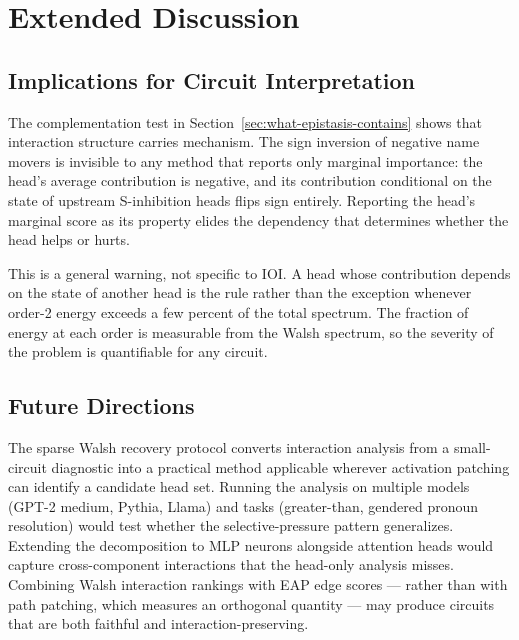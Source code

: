 \documentclass{article}
\begin{document}
\section{Extended Discussion}



\subsection{Implications for Circuit Interpretation}

The complementation test in
Section~\ref{sec:what-epistasis-contains} shows that interaction
structure carries mechanism. The sign inversion of negative name movers
is invisible to any method that reports only marginal importance: the
head's average contribution is negative, and its contribution
conditional on the state of upstream S-inhibition heads flips sign
entirely. Reporting the head's marginal score as its property elides
the dependency that determines whether the head helps or hurts.

This is a general warning, not specific to IOI. A head whose
contribution depends on the state of another head is the rule rather
than the exception whenever order-2 energy exceeds a few percent of
the total spectrum. The fraction of energy at each order is measurable
from the Walsh spectrum, so the severity of the problem is quantifiable
for any circuit.

\subsection{Future Directions}

The sparse Walsh recovery protocol converts interaction analysis from a
small-circuit diagnostic into a practical method applicable wherever
activation patching can identify a candidate head set. Running the
analysis on multiple models (GPT-2 medium, Pythia, Llama) and tasks
(greater-than, gendered pronoun resolution) would test whether the
selective-pressure pattern generalizes. Extending the decomposition to
MLP neurons alongside attention heads would capture cross-component
interactions that the head-only analysis misses. Combining Walsh
interaction rankings with EAP edge scores --- rather than with path
patching, which measures an orthogonal quantity --- may produce circuits
that are both faithful and interaction-preserving.
\end{document}
